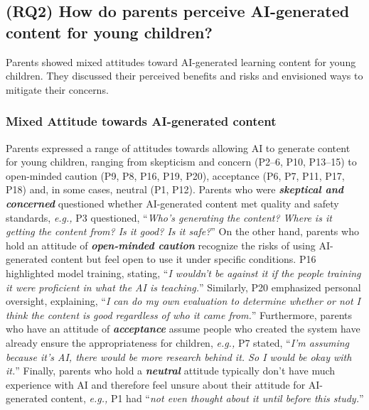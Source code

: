 
\subsection{(RQ2) How do parents perceive AI-generated content for young children?}\label{sec-result-2}

Parents showed mixed attitudes toward AI-generated learning content for young children. They discussed their perceived benefits and risks and envisioned ways to mitigate their concerns.

\subsubsection{Mixed Attitude towards AI-generated content}
Parents expressed a range of attitudes towards allowing AI to generate content for young children, ranging from skepticism and concern (P2--6, P10, P13--15) to open-minded caution (P9, P8, P16, P19, P20), acceptance (P6, P7, P11, P17, P18) and, in some cases, neutral (P1, P12). Parents who were \textit{\textbf{skeptical and concerned}} questioned whether AI-generated content met quality and safety standards, \textit{e.g.,} P3 questioned, ``\textit{Who's generating the content? Where is it getting the content from? Is it good? Is it safe?}'' On the other hand, parents who hold an attitude of \textit{\textbf{open-minded caution}} recognize the risks of using AI-generated content but feel open to use it under specific conditions. P16 highlighted model training, stating, ``\textit{I wouldn't be against it if the people training it were proficient in what the AI is teaching.}'' Similarly, P20 emphasized personal oversight, explaining, ``\textit{I can do my own evaluation to determine whether or not I think the content is good regardless of who it came from.}'' Furthermore, parents who have an attitude of \textit{\textbf{acceptance}} assume people who created the system have already ensure the appropriateness for children, \textit{e.g.,} P7 stated, ``\textit{I'm assuming because it's AI, there would be more research behind it.  So I would be okay with it.}'' Finally, parents who hold a \textit{\textbf{neutral}} attitude typically don't have much experience with AI and therefore feel unsure about their attitude for AI-generated content, \textit{e.g.,} P1 had ``\textit{not even thought about it until before this study.}''

